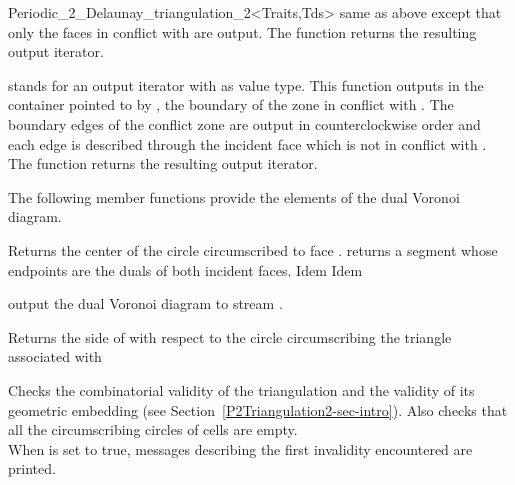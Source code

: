 \begin{ccRefClass}{Periodic_2_Delaunay_triangulation_2<Traits,Tds>}
%
{same as above except that only the faces in conflict with  are
  output. The function returns the resulting output
  iterator. }

%
{  stands for an output iterator with
   as value type.  This function outputs in the container
  pointed to by , the boundary of the zone in conflict with
  . The boundary edges of the conflict zone are output in
  counterclockwise order and each edge is described through the
  incident face which is not in conflict with .  The function
  returns the resulting output iterator. }

The following member functions provide the elements of the
dual Voronoi diagram.

{Returns the center of the circle circumscribed to face .}
\ccGlue %
{returns a segment whose endpoints are the duals of both incident
  faces.} %
\ccGlue %
 {Idem} %
\ccGlue %
 {Idem}

{output the dual Voronoi diagram to stream .}

\ccPredicates
{}
\ccThreeToTwo

{Returns the side of  with respect to the circle
  circumscribing the triangle associated with }

\begin{ccAdvanced}
{Checks the combinatorial validity of the triangulation and the
validity of its geometric embedding (see
Section~\ref{P2Triangulation2-sec-intro}). Also checks that all the
circumscribing circles of cells are empty.\\
When  is set to true,  messages describing the first
invalidity encountered are printed.}


\end{ccAdvanced}
\end{ccRefClass}
